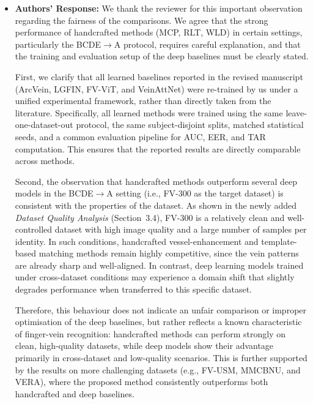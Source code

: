 \documentclass[11pt]{article}
\theoremstyle{remark}
\begin{document}
\begin{itemize}
	\item \textbf{Authors' Response:} 
	We thank the reviewer for this important observation regarding the fairness of the comparisons. We agree that the strong performance of handcrafted methods (MCP, RLT, WLD) in certain settings, particularly the BCDE$\rightarrow$A protocol, requires careful explanation, and that the training and evaluation setup of the deep baselines must be clearly stated.

	First, we clarify that {all learned baselines reported in the revised manuscript (ArcVein, LGFIN, FV-ViT, and VeinAttNet) were re-trained by us} under a unified experimental framework, rather than directly taken from the literature. Specifically, all learned methods were trained using the same leave-one-dataset-out protocol, the same subject-disjoint splits, matched statistical seeds, and a common evaluation pipeline for AUC, EER, and TAR computation. This ensures that the reported results are directly comparable across methods.

	Second, the observation that handcrafted methods outperform several deep models in the BCDE$\rightarrow$A setting (i.e., FV-300 as the target dataset) is consistent with the properties of the dataset. As shown in the newly added \emph{Dataset Quality Analysis} (Section~3.4), FV-300 is a relatively clean and well-controlled dataset with high image quality and a large number of samples per identity. In such conditions, handcrafted vessel-enhancement and template-based matching methods remain highly competitive, since the vein patterns are already sharp and well-aligned. In contrast, deep learning models trained under cross-dataset conditions may experience a domain shift that slightly degrades performance when transferred to this specific dataset.

	Therefore, this behaviour does not indicate an unfair comparison or improper optimisation of the deep baselines, but rather reflects a known characteristic of finger-vein recognition: handcrafted methods can perform strongly on clean, high-quality datasets, while deep models show their advantage primarily in cross-dataset and low-quality scenarios. This is further supported by the results on more challenging datasets (e.g., FV-USM, MMCBNU, and VERA), where the proposed method consistently outperforms both handcrafted and deep baselines.


\end{itemize}
\end{document}
